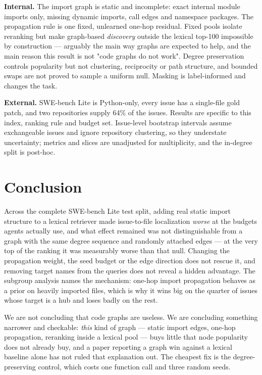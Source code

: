 \documentclass[10pt,a4paper]{article}
\begin{document}
\textbf{Internal.} The import graph is static and incomplete: exact internal module imports only, missing dynamic imports, call edges and namespace packages. The propagation rule is one fixed, unlearned one-hop residual. Fixed pools isolate reranking but make graph-based \textit{discovery} outside the lexical top-100 impossible by construction --- arguably the main way graphs are expected to help, and the main reason this result is not "code graphs do not work". Degree preservation controls popularity but not clustering, reciprocity or path structure, and bounded swaps are not proved to sample a uniform null. Masking is label-informed and changes the task.

\textbf{External.} SWE-bench Lite is Python-only, every issue has a single-file gold patch, and two repositories supply 64\% of the issues. Results are specific to this index, ranking rule and budget set. Issue-level bootstrap intervals assume exchangeable issues and ignore repository clustering, so they understate uncertainty; metrics and slices are unadjusted for multiplicity, and the in-degree split is post-hoc.

\section{Conclusion}
Across the complete SWE-bench Lite test split, adding real static import structure to a lexical retriever made issue-to-file localization \textit{worse} at the budgets agents actually use, and what effect remained was not distinguishable from a graph with the same degree sequence and randomly attached edges --- at the very top of the ranking it was measurably worse than that null. Changing the propagation weight, the seed budget or the edge direction does not rescue it, and removing target names from the queries does not reveal a hidden advantage. The subgroup analysis names the mechanism: one-hop import propagation behaves as a prior on heavily imported files, which is why it wins big on the quarter of issues whose target is a hub and loses badly on the rest.

We are not concluding that code graphs are useless. We are concluding something narrower and checkable: \textit{this} kind of graph --- static import edges, one-hop propagation, reranking inside a lexical pool --- buys little that node popularity does not already buy, and a paper reporting a graph win against a lexical baseline alone has not ruled that explanation out. The cheapest fix is the degree-preserving control, which costs one function call and three random seeds.
\end{document}
